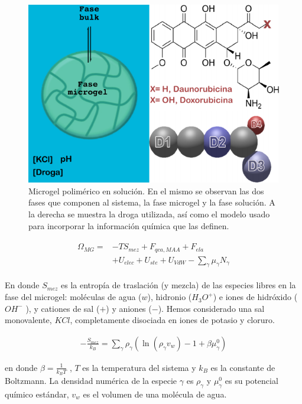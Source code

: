\begin{figure}[!ht]
	\centering
	\includegraphics[width=0.65\linewidth]{Figures/graph-gel/gel_model.pdf}
	\caption{Microgel polim\'erico en soluci\'on. En el mismo se observan las dos fases que componen al sistema, la fase microgel y la fase soluci\'on. A la derecha se muestra la droga utilizada, as\'i como el modelo usado para incorporar la informaci\'on qu\'imica que las definen.}
	\label{fig:gel:model_gel}
\end{figure}




%
\begin{align}
    \begin{aligned}
       \Omega_{MG}=& -TS_{mez} + F_{qca,MAA} +  F_{ela}\\
       & + U_{elec}+  U_{ste} + U_{VdW} -{\sum_{\gamma}
        {\mu_\gamma N_\gamma}}
    \end{aligned}
    \label{eq:gel:free-energy-implicit}
\end{align}
%

\noindent En donde $S_{mez}$ es la entrop\'ia de traslaci\'on (y mezcla) de las especies libres en la fase del microgel: mol\'eculas de agua ($w$), hidronio ($H_3O^+$) e iones de hidr\'oxido ($OH^-$ ), y cationes de sal ($+$) y aniones ($-$).
Hemos considerado una sal monovalente, $KCl$,  completamente disociada en iones de potasio y cloruro.

\begin{align}
-\frac{S_{mez}}{k_B}	= \sum_{\gamma} \rho_\gamma\left(\ln\left(\rho_\gamma v_w\right) -1 + \beta\mu^0_\gamma\right) 
\end{align}

\noindent en donde  $\beta=\frac{1}{k_BT}$ , $T$ es la temperatura del sistema  y  $k_B$ es la constante de Boltzmann. La densidad num\'erica de la especie $\gamma$ es $\rho_\gamma$ y $\mu^0_\gamma$ es su potencial qu\'imico est\'andar,  $v_w$ es el volumen de una mol\'ecula de agua.

